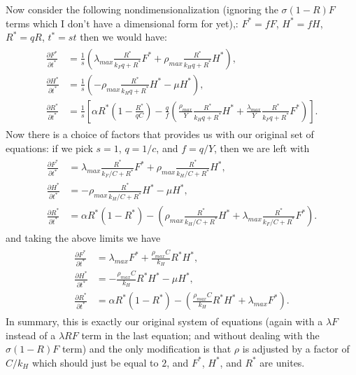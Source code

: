 \documentclass{pnastwo}
\begin{document}
\begin{article}
Now consider the following nondimensionalization (ignoring the $\sigma (1-R)F$ terms which I don't have a dimensional form for yet),: $F^{*}=fF$, $H^{*}=fH$, $R^{*}=qR$, $t^{*}=st$ then we would have:
\begin{align} 
\begin{split}
\frac{\partial F^{*}}{\partial t^{*}} &= \frac{1}{s}\left(\lambda_{max}\frac{R^{*}}{k_{F}q+R^{*}} F^{*} + \rho_{max}\frac{R^{*}}{k_{H}q+R^{*}}H^{*}\right),  \\
\frac{\partial H^{*}}{\partial t^{*}} &=  \frac{1}{s}\left(- \rho_{max}\frac{R^{*}}{k_{H}q+R^{*}}H^{*} - \mu H^{*}\right),  \\
\frac{\partial R^{*}}{\partial t^{*}} &=  \frac{1}{s}\left[\alpha R^{*}\left(1-\frac{R^{*}}{qC}\right) -\frac{q}{f}\left(\frac{\rho_{max}}{Y}\frac{R^{*}}{k_{H}q+R^{*}}H^{*}+\frac{\lambda_{max}}{Y}\frac{R^{*}}{k_{F}q+R^{*}}F^{*}\right)\right].
\end{split}
\end{align}
Now there is a choice of factors that provides us with our original set of equations: if we pick $s=1$, $q=1/c$, and $f=q/Y$, then we are left with 
\begin{align} 
\begin{split}
\frac{\partial F^{*}}{\partial t^{*}} &=\lambda_{max}\frac{R^{*}}{k_{F}/C+R^{*}} F^{*} + \rho_{max}\frac{R^{*}}{k_{H}/C+R^{*}}H^{*},  \\
\frac{\partial H^{*}}{\partial t^{*}} &=  - \rho_{max}\frac{R^{*}}{k_{H}/C+R^{*}}H^{*} - \mu H^{*},  \\
\frac{\partial R^{*}}{\partial t^{*}} &=  \alpha R^{*}\left(1-R^{*}\right) -\left(\rho_{max}\frac{R^{*}}{k_{H}/C+R^{*}}H^{*}+\lambda_{max}\frac{R^{*}}{k_{F}/C+R^{*}}F^{*}\right).
\end{split}
\end{align}
and taking the above limits we have 
\begin{align} 
\begin{split}
\frac{\partial F^{*}}{\partial t^{*}} &=\lambda_{max}F^{*} + \frac{\rho_{max}C}{k_{H}}R^{*}H^{*},  \\
\frac{\partial H^{*}}{\partial t^{*}} &=  - \frac{\rho_{max}C}{k_{H}}R^{*}H^{*} - \mu H^{*},  \\
\frac{\partial R^{*}}{\partial t^{*}} &=  \alpha R^{*}\left(1-R^{*}\right) -\left(\frac{\rho_{max}C}{k_{H}}R^{*}H^{*}+\lambda_{max}F^{*}\right).
\end{split}
\end{align}
In summary, this is exactly our original system of equations (again with a $\lambda F$ instead of a $\lambda RF$ term in the last equation; and without dealing with the $\sigma (1-R)F$ term) and the only modification is that $\rho$ is adjusted by a factor of $C/k_{H}$ which should just be equal to $2$, and $F^{*}$, $H^{*}$, and $R^{*}$ are unites. 


\end{article}
\end{document}
